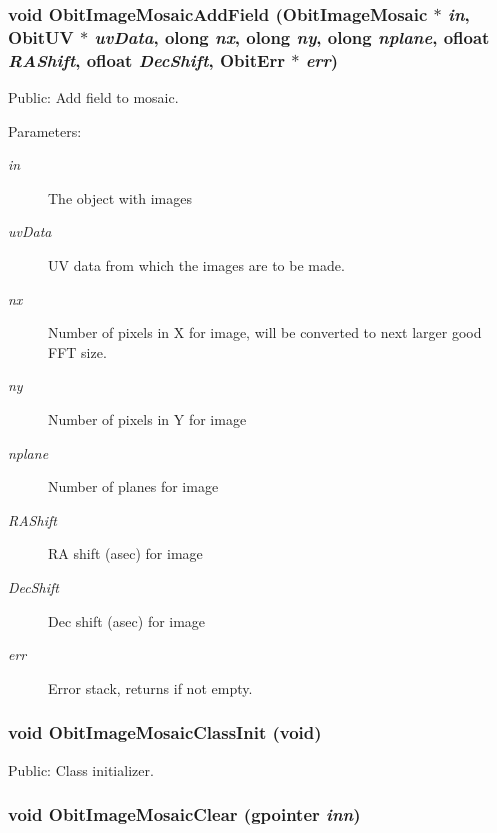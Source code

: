 \subsubsection{\setlength{\rightskip}{0pt plus 5cm}void Obit\-Image\-Mosaic\-Add\-Field ({\bf Obit\-Image\-Mosaic} $\ast$ {\em in}, {\bf Obit\-UV} $\ast$ {\em uv\-Data}, {\bf olong} {\em nx}, {\bf olong} {\em ny}, {\bf olong} {\em nplane}, {\bf ofloat} {\em RAShift}, {\bf ofloat} {\em Dec\-Shift}, {\bf Obit\-Err} $\ast$ {\em err})}\label{ObitImageMosaic_8c_a24}


Public: Add field to mosaic. 

\begin{Desc}
\item[Parameters:]
\begin{description}
\item[{\em in}]The object with images \item[{\em uv\-Data}]UV data from which the images are to be made. \item[{\em nx}]Number of pixels in X for image, will be converted to next larger good FFT size. \item[{\em ny}]Number of pixels in Y for image \item[{\em nplane}]Number of planes for image \item[{\em RAShift}]RA shift (asec) for image \item[{\em Dec\-Shift}]Dec shift (asec) for image \item[{\em err}]Error stack, returns if not empty. \end{description}
\end{Desc}
\subsubsection{\setlength{\rightskip}{0pt plus 5cm}void Obit\-Image\-Mosaic\-Class\-Init (void)}\label{ObitImageMosaic_8c_a32}


Public: Class initializer. 

\subsubsection{\setlength{\rightskip}{0pt plus 5cm}void Obit\-Image\-Mosaic\-Clear (gpointer {\em inn})}\label{ObitImageMosaic_8c_a5}


